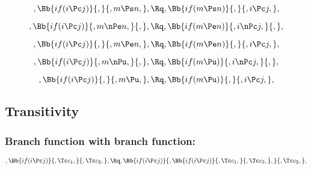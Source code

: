 \bigskip
\bigskip
\[, \Bb{if(i \Pc j)}{,}{,m \Ps n,}, \Rq , \Bb{if(m \Ps n)}{,}{,i \Pc j,},\]

\bigskip
\bigskip
\[, \Bb{if(i \Pc j)}{,m \nPe n,}{,}, \Rq , \Bb{if(m \Pe n)}{,i \nPc j,}{,},\]

\bigskip
\bigskip
\[, \Bb{if(i \Pc j)}{,}{,m \Pe n,}, \Rq , \Bb{if(m \Pe n)}{,}{,i \Pc j,},\]

\bigskip
\bigskip
\[, \Bb{if(i \Pc j)}{,m \nPu,}{,}, \Rq , \Bb{if(m \Pu)}{,i \nPc j,}{,},\]

\bigskip
\bigskip
\[, \Bb{if(i \Pc j)}{,}{,m \Pu,}, \Rq , \Bb{if(m \Pu)}{,}{,i \Pc j,},\]









\bigskip
\bigskip
\bigskip
\bigskip
\subsection{Transitivity}
\subsubsection{Branch function with branch function:}
\[, \Bb{if(i \Pc j)}{,\Tc c_1,}{,\Tc c_2,}, \Rq , \Bb{if(i \Pc j)}{,\Bb{if(i \Pc j)}{,\Tc c_1,}{,\Tc c_3,},}{,\Tc c_2,},\]


